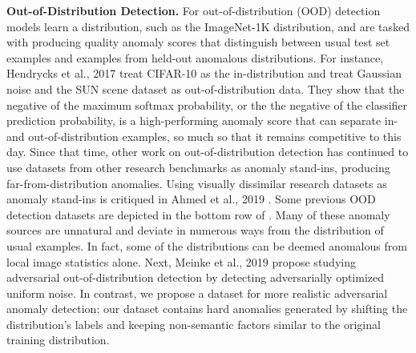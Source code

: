 \documentclass[10pt,twocolumn,letterpaper]{article}
\begin{document}
\noindent\textbf{Out-of-Distribution Detection.}\quad 
For out-of-distribution (OOD) detection \cite{hendrycks17baseline,kimin,hendrycks2019oe,hendrycks2019selfsupervised} models learn a distribution, such as the ImageNet-1K distribution, and are tasked with producing quality anomaly scores that distinguish between usual test set examples and examples from held-out anomalous distributions.
For instance, Hendrycks et al., 2017 \cite{hendrycks17baseline} treat CIFAR-10 as the in-distribution and treat Gaussian noise and the SUN scene dataset \cite{Xiao2010SUNDL} as out-of-distribution data.
They show that the negative of the maximum softmax probability, or the the negative of the classifier prediction probability, is a high-performing anomaly score that can separate in- and out-of-distribution examples, so much so that it remains competitive to this day.
Since that time, other work on out-of-distribution detection has continued to use datasets from other research benchmarks as anomaly stand-ins, producing far-from-distribution anomalies. Using visually dissimilar research datasets as anomaly stand-ins is critiqued in Ahmed et al., 2019 \cite{Ahmed2019DetectingSA}. Some previous OOD detection datasets are depicted in the bottom row of  \cite{hendrycks2019oe}.
Many of these anomaly sources are unnatural and deviate in numerous ways from the distribution of usual examples. In fact, some of the distributions can be deemed anomalous from local image statistics alone. Next, Meinke et al., 2019 \cite{Meinke2019TowardsNN} propose studying adversarial out-of-distribution detection by detecting adversarially optimized uniform noise. In contrast, we propose a dataset for more realistic adversarial anomaly detection; our dataset contains hard anomalies generated by shifting the distribution's labels and keeping non-semantic factors similar to the original training distribution.
\end{document}
